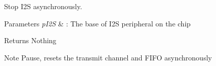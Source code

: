 Stop I2\-S asynchronously. 


\begin{DoxyParams}{Parameters}
{\em p\-I2\-S} & \-: The base of I2\-S peripheral on the chip \\
\hline
\end{DoxyParams}
\begin{DoxyReturn}{Returns}
Nothing 
\end{DoxyReturn}
\begin{DoxyNote}{Note}
Pause, resets the transmit channel and F\-I\-F\-O asynchronously 
\end{DoxyNote}
